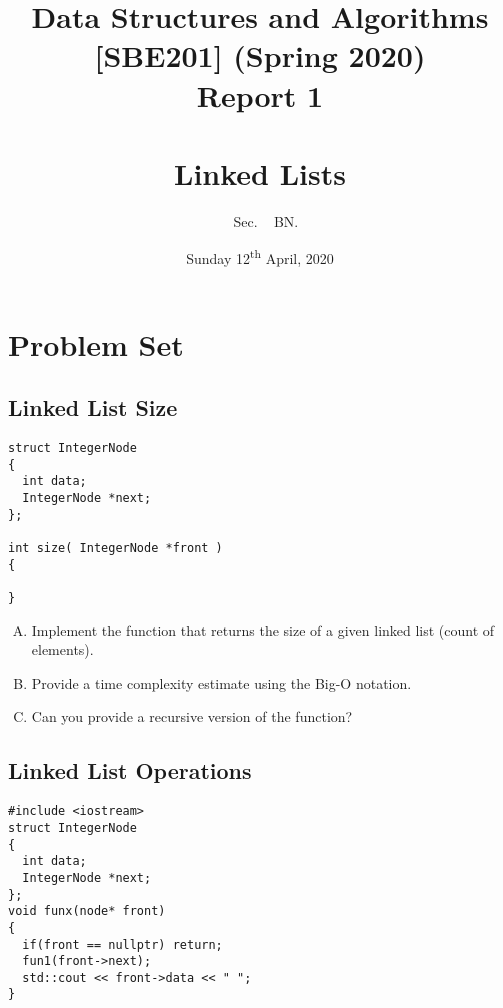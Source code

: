 \documentclass[usenames,dvipsnames]{article}
\author{\studentname ~ Sec. \SN ~ BN. \BN}
\date{Sunday 12\textsuperscript{th} April, 2020}
\title{Data Structures and Algorithms [SBE201] (Spring 2020)\\ Report 1\\~\\
{\small  Linked Lists }}
\begin{document}
\maketitle

\section{Problem Set}

\subsection{Linked List Size}

\begin{verbatim}
struct IntegerNode
{
  int data;
  IntegerNode *next;
};

int size( IntegerNode *front )
{

}
\end{verbatim}


\begin{question}
\begin{enumerate}[A)]
\item Implement the function  that returns the size of a given linked list (count of elements).
\item Provide a time complexity estimate using the Big-O notation.
\item Can you provide a recursive version of the  function?
\end{enumerate}
\end{question}

\begin{solution}


\end{solution}


\subsection{Linked List Operations}

\begin{verbatim}
#include <iostream>
struct IntegerNode
{
  int data;
  IntegerNode *next;
};
void funx(node* front)
{
  if(front == nullptr) return;
  fun1(front->next);
  std::cout << front->data << " ";
}
\end{verbatim}
\end{document}
